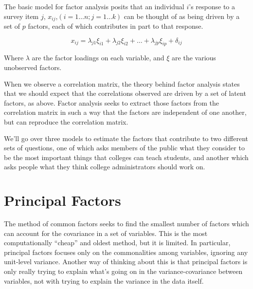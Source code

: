 \documentclass[12pt]{article}
\begin{document}
The basic model for factor analysis posits that an individual $i$'s 
response to a survey item $j$, $x_{ij}$,$(i=1 \ldots n;j=1 \ldots k)$ can
be thought of as being driven by a set of $p$ factors, each of which
contributes in part to that response.

\begin{equation*}
  x_{ij}= \lambda_{j1} \xi_{i1}+ \lambda_{j2} \xi_{i2}+ \ldots +
  \lambda_{jp} \xi_{ip}+\delta_{ij}
\end{equation*}

Where $\lambda$ are the factor loadings on each variable, and $\xi$
are the various unobserved factors. 

When we observe a correlation matrix, the theory behind factor
analysis states that we should expect that the correlations observed
are driven by a set of latent factors, as above. Factor analysis seeks
to extract those factors from the correlation matrix in such a way
that the factors are independent of one another, but can reproduce the
correlation matrix. 

We'll go over three models to estimate the factors that contribute to
two different sets of questions, one of which asks members of the
public what they consider to be the most important things that
colleges can teach students, and another which asks people what they
think college administrators should work on. 


\section{Principal Factors}

The method of common factors seeks to find the smallest number of
factors which can account for the covariance in a set of
variables. This is the most computationally ``cheap'' and oldest
method, but it is limited. In particular, principal factors focuses
only on the commonalities among variables, ignoring any unit-level
variance. Another way of thinking about this is that principal factors
is only really trying to explain what's going on in the
variance-covariance between variables, not with trying to explain the
variance in the data itself. 
\end{document}
